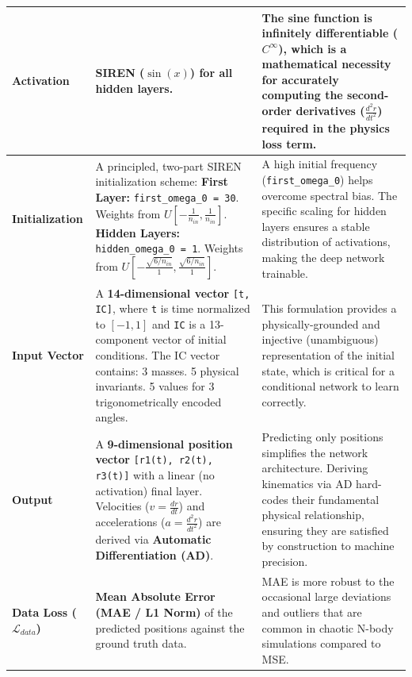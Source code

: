 \documentclass{article}
\begin{document}
\begin{small}
\begin{longtable}{|>{\raggedright\arraybackslash}p{}|>{\raggedright\arraybackslash}p{}|>{\raggedright\arraybackslash}p{}|}
\hline
\textbf{Activation} & \textbf{SIREN ($\sin(x)$)} for all hidden layers. & The sine function is infinitely differentiable ($C^{\infty}$), which is a mathematical necessity for accurately computing the second-order derivatives ($\frac{d^{2}r}{dt^{2}}$) required in the physics loss term. \\
\hline
\textbf{Initialization} & A principled, two-part SIREN initialization scheme: \newline \textbullet{} \textbf{First Layer:} \texttt{first\_omega\_0 = 30}. Weights from $U[-\frac{1}{n_{in}}, \frac{1}{n_{in}}]$. \newline \textbullet{} \textbf{Hidden Layers:} \texttt{hidden\_omega\_0 = 1}. Weights from $U[-\frac{\sqrt{6/n_{in}}}{1}, \frac{\sqrt{6/n_{in}}}{1}]$. & A high initial frequency (\texttt{first\_omega\_0}) helps overcome spectral bias. The specific scaling for hidden layers ensures a stable distribution of activations, making the deep network trainable. \\
\hline
\textbf{Input Vector} & A \textbf{14-dimensional vector} \texttt{[t, IC]}, where \texttt{t} is time normalized to $[-1,1]$ and \texttt{IC} is a 13-component vector of initial conditions. The IC vector contains: \newline \textbullet{} 3 masses. \newline \textbullet{} 5 physical invariants. \newline \textbullet{} 5 values for 3 trigonometrically encoded angles. & This formulation provides a physically-grounded and injective (unambiguous) representation of the initial state, which is critical for a conditional network to learn correctly. \\
\hline
\textbf{Output} & A \textbf{9-dimensional position vector} \texttt{[r1(t), r2(t), r3(t)]} with a linear (no activation) final layer. Velocities ($v=\frac{dr}{dt}$) and accelerations ($a=\frac{d^{2}r}{dt^{2}}$) are derived via \textbf{Automatic Differentiation (AD)}. & Predicting only positions simplifies the network architecture. Deriving kinematics via AD hard-codes their fundamental physical relationship, ensuring they are satisfied by construction to machine precision. \\
\hline
\textbf{Data Loss ($\mathcal{L}_{data}$)} & \textbf{Mean Absolute Error (MAE / L1 Norm)} of the predicted positions against the ground truth data. & MAE is more robust to the occasional large deviations and outliers that are common in chaotic N-body simulations compared to MSE. \\
\hline

\end{longtable}
\end{small}
\end{document}
